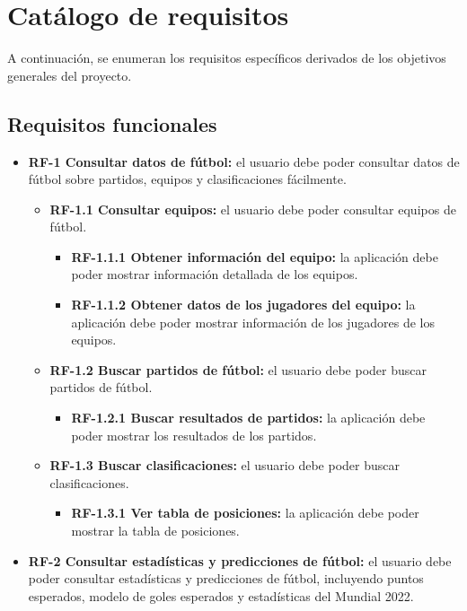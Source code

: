 \section{Catálogo de requisitos}
A continuación, se enumeran los requisitos específicos derivados de los objetivos generales del proyecto.
\subsection{Requisitos funcionales}
\begin{itemize}[label=\textbullet]
    \item \textbf{RF-1 Consultar datos de fútbol:} el usuario debe poder consultar datos de fútbol sobre partidos, equipos y clasificaciones fácilmente.
    \begin{itemize}[label=\textbullet]
        \item \textbf{RF-1.1 Consultar equipos:} el usuario debe poder consultar equipos de fútbol.
        \begin{itemize}[label=$\circ$]
            \item \textbf{RF-1.1.1 Obtener información del equipo:} la aplicación debe poder mostrar información detallada de los equipos.
            \item \textbf{RF-1.1.2 Obtener datos de los jugadores del equipo:} la aplicación debe poder mostrar información de los jugadores de los equipos.
        \end{itemize}
        \item \textbf{RF-1.2 Buscar partidos de fútbol:} el usuario debe poder buscar partidos de fútbol.
        \begin{itemize}[label=$\circ$]
            \item \textbf{RF-1.2.1 Buscar resultados de partidos:} la aplicación debe poder mostrar los resultados de los partidos.
        \end{itemize}
        \item \textbf{RF-1.3 Buscar clasificaciones:} el usuario debe poder buscar clasificaciones.
        \begin{itemize}[label=$\circ$]
            \item \textbf{RF-1.3.1 Ver tabla de posiciones:} la aplicación debe poder mostrar la tabla de posiciones.
        \end{itemize}
    \end{itemize}
    \item \textbf{RF-2 Consultar estadísticas y predicciones de fútbol:} el usuario debe poder consultar estadísticas y predicciones de fútbol, incluyendo puntos esperados, modelo de goles esperados y estadísticas del Mundial 2022.

\end{itemize}
